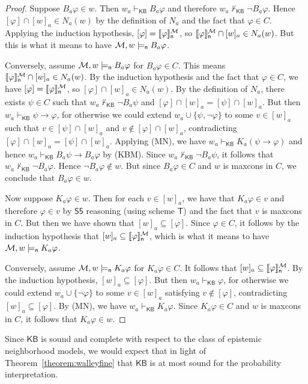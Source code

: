 \documentclass[12pt]{article}
\theoremstyle{definition}
\newcommand{\M}{{\cal M}}      %
\newcommand{\KB}{{\mathsf{KB}}}                        %
\newcommand{\modelsn}{\models_{\mathsf{n}}}                  %
\newcommand{\semn}[1]{\llbracket{#1}\rrbracket_{\mathsf{n}}} %
\begin{document}
\begin{proof}
  Suppose $B_a\varphi\in w$. Then $w_a\vdash_\KB B_a\varphi$ and
  therefore $w_a\nvdash_\KB\lnot B_a\varphi$.  Hence
  $[\varphi]\cap[w]_a\in N_a(w)$ by the definition of $N_a$ and the
  fact that $\varphi\in C$. Applying the induction hypothesis,
  $[\varphi]=\semn{\varphi}^\M$, so $\semn{\varphi}^\M\cap[w]_a\in
  N_a(w)$.  But this is what it means to have $\M,w\modelsn
  B_a\varphi$.

  Conversely, assume $\M,w\modelsn B_a\varphi$ for $B_a\varphi\in
  C$. This means $\semn{\varphi}^\M\cap[w]_a\in N_a(w)$.  By the
  induction hypothesis and the fact that $\varphi\in C$, we have
  $[\varphi]=\semn{\varphi}^\M$, so $[\varphi]\cap[w]_a\in N_a(w)$.
  By the definition of $N_a$, there exists $\psi\in C$ such that
  $w_a\nvdash_\KB \lnot B_a\psi$ and
  $[\varphi]\cap[w]_a=[\psi]\cap[w]_a$.  But then
  $w_a\vdash_\KB\psi\to\varphi$, for otherwise we could extend
  $w_a\cup\{\psi,\lnot\varphi\}$ to some $v\in[w]_a$ such that
  $v\in[\psi]\cap[w]_a$ and $v\notin[\varphi]\cap[w]_a$, contradicting
  $[\varphi]\cap[w]_a=[\psi]\cap[w]_a$.  Applying (MN), we have
  $w_a\vdash_\KB K_a(\psi\to\varphi)$ and hence $w_a\vdash_\KB
  B_a\psi\to B_a\varphi$ by (KBM).  Since $w_a\nvdash_\KB \lnot
  B_a\psi$, it follows that $w_a\nvdash_\KB \lnot B_a\varphi$.  Hence
  $\lnot B_a\varphi\notin w$. But since $B_a\varphi\in C$ and $w$ is
  maxcons in $C$, we conclude that $B_a\varphi\in w$.

  Now suppose $K_a\varphi\in w$.  Then for each $v\in [w]_a$, we have
  that $K_a\varphi\in v$ and therefore $\varphi\in v$ by $\mathsf{S5}$
  reasoning (using scheme $\mathsf{T}$) and the fact that $v$ is
  maxcons in $C$.  But then we have shown that
  $[w]_a\subseteq[\varphi]$.  Since $\varphi\in C$, it follows by the
  induction hypothesis that $[w]_a\subseteq\semn{\varphi}^\M$, which
  is what it means to have $\M,w\modelsn K_a\varphi$.

  Conversely, assume $\M,w\modelsn K_a\varphi$ for $K_a\varphi\in
  C$. It follows that $[w]_a\subseteq\semn{\varphi}^\M$.  By the
  induction hypothesis, $[w]_a\subseteq[\varphi]$.  But then
  $w_a\vdash_\KB\varphi$, for otherwise we could extend
  $w_a\cup\{\lnot\varphi\}$ to some $v\in[w]_a$ satisfying
  $v\notin[\varphi]$, contradicting $[w]_a\subseteq[\varphi]$.  By
  (MN), we have $w_a\vdash_\KB K_a\varphi$.  Since $K_a\varphi\in C$
  and $w$ is maxcons in $C$, it follows that $K_a\varphi\in w$.
\end{proof}

Since $\KB$ is sound and complete with respect to the class of
epistemic neighborhood models, we would expect that in light of
Theorem~\ref{theorem:walleyfine} that $\KB$ is at most sound for the
probability interpretation.
\end{document}
